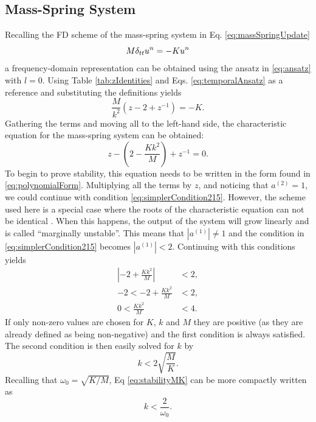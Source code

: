{{\subsection{Mass-Spring System}\label{sec:massSpringStability}
Recalling the FD scheme of the mass-spring system in Eq. \eqref{eq:massSpringUpdate}
\begin{equation*}
    M \delta_{tt} u^n = -K u^n
\end{equation*} 
a frequency-domain representation can be obtained using the ansatz in \eqref{eq:ansatz} with $l = 0$. Using Table \ref{tab:zIdentities} and Eqs. \eqref{eq:temporalAnsatz} as a reference and substituting the definitions yields
\begin{equation*}
    \frac{M}{k^2}\left(z -2 +z^{-1}\right) = -K.
\end{equation*}
Gathering the terms and moving all to the left-hand side, the characteristic equation for the mass-spring system can be obtained:
\begin{equation}\label{eq:massSpringCharacteristic}
    z - \left(2-\frac{Kk^2}{M} \right) + z^{-1} = 0. 
\end{equation}
To begin to prove stability, this equation needs to be written in the form found in \eqref{eq:polynomialForm}. Multiplying all the terms by $z$, and noticing that $a^{(2)} = 1$, we could continue with condition \eqref{eq:simplerCondition215}. However, the scheme used here is a special case where the roots of the characteristic equation can not be identical \cite{theBible}. When this happens, the output of the system will grow linearly and is called ``marginally unstable''. This means that $|a^{(1)}|\neq 1$ and the condition in \eqref{eq:simplerCondition215} becomes $|a^{(1)}|<2$. Continuing with this conditions yields
\begin{align*}
    \left|-2+\frac{Kk^2}{M}\right| &< 2,\\
    -2 < -2+\frac{Kk^2}{M} &< 2,\\
    0 < \frac{Kk^2}{M} &< 4.
\end{align*}
If only non-zero values are chosen for $K$, $k$ and $M$ they are positive (as they are already defined as being non-negative) and the first condition is always satisfied. The second condition is then easily solved for $k$ by
\begin{equation}\label{eq:stabilityMK}
    k < 2\sqrt{\frac{M}{K}}.
\end{equation}
Recalling that $\omega_0 = \sqrt{K/M}$, Eq \eqref{eq:stabilityMK} can be more compactly written as 
\begin{equation}
    k <\frac{2}{\omega_0}.
\end{equation}

}}
